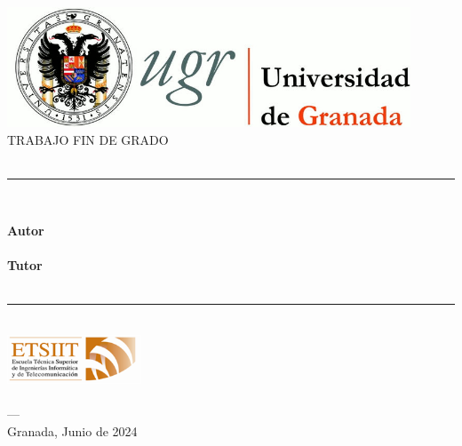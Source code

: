 \begin{titlepage}

\newlength{\centeroffset}
\setlength{\centeroffset}{-0.5\oddsidemargin}
\addtolength{\centeroffset}{0.5\evensidemargin}
\thispagestyle{empty}

\noindent\hspace*{\centeroffset}\begin{minipage}{\textwidth}
\centering

    \includegraphics[width=0.9\textwidth]{img/logo_ugr.jpg}\\[1.4cm]
    
    \textsc{\Large TRABAJO FIN DE GRADO\\[2mm]}
    \textsc{\large \myDegree}\\[5mm]

    \noindent\rule[1ex]{\textwidth}{1.25pt}\\[5mm]
    
    
    {\Huge\bfseries \myTitle}

\end{minipage}

\vspace{2.5cm}

\noindent\hspace*{\centeroffset}\begin{minipage}{\textwidth}
\centering

    \textbf{Autor} \\ 
    {\myName} \\[5mm]
    
    \textbf{Tutor} \\
    {\myProf}\\[15mm]


    \noindent\rule[1ex]{\textwidth}{1.25pt}\\[5mm]
    
    \includegraphics[width=0.3\textwidth]{img/etsiit_logo.png}\\[3mm]
    \textsc{\myFacultyShort}\\
    \textsc{---}\\
    Granada, Junio de 2024

\end{minipage}
\end{titlepage}